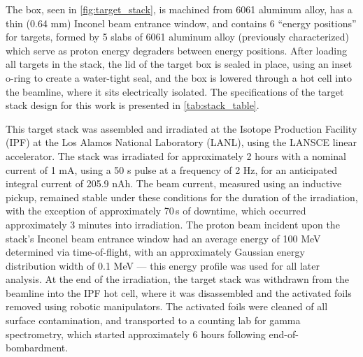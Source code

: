 The box, seen in \autoref{fig:target_stack}, is machined from 6061 aluminum alloy, has a thin (0.64 mm) Inconel beam entrance window, and  contains 6 \enquote{energy positions} for targets, formed by  5 slabs of 6061 aluminum alloy (previously characterized) which serve as proton energy degraders  between energy positions.
After loading all targets in the stack, the lid of the target box is sealed in place, using an inset o-ring to create a water-tight seal, and the box is lowered through a hot cell into the beamline, where it sits electrically isolated.
The specifications of the target stack design for this work is presented in \autoref{tab:stack_table}.



This target stack was assembled and irradiated at the Isotope Production Facility (IPF) at the Los Alamos National Laboratory (LANL), using the LANSCE linear accelerator. 
The stack was irradiated for approximately 2 hours with a nominal current of 1 mA, using a 50 \mmicro s pulse at a frequency of 2 Hz, for an anticipated integral current of 205.9 nAh.
The beam current, measured using an inductive pickup, remained stable under these conditions for the duration of the irradiation, with the exception of approximately 70\,s of downtime, which occurred approximately 3 minutes into irradiation.
The proton beam incident upon the stack's Inconel beam entrance window had an average energy of 100 MeV determined via time-of-flight, with an approximately Gaussian energy distribution width of 0.1 MeV --- this energy profile was used for all later analysis.
At the end of the irradiation, the target stack was withdrawn from the beamline into the IPF hot cell, where it was disassembled and the activated foils removed using robotic manipulators.
The activated foils were cleaned of all surface contamination, and transported to a counting lab for gamma spectrometry, which started approximately 6 hours following end-of-bombardment.





